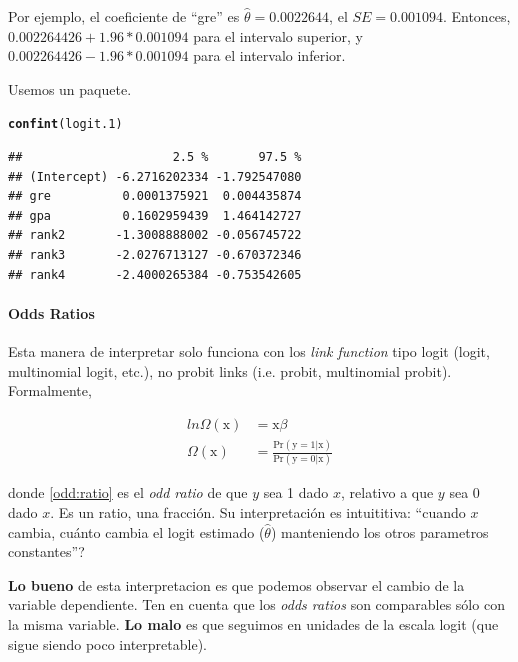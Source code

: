 \documentclass[onesided]{article}\usepackage[]{graphicx}\usepackage[]{color}
\makeatletter
\newcommand{\hlstd}[1]{\textcolor[rgb]{0.345,0.345,0.345}{#1}}%
\newcommand{\hlkwd}[1]{\textcolor[rgb]{0.737,0.353,0.396}{\textbf{#1}}}%
\newenvironment{kframe}{%
 \def\at@end@of@kframe{}%
 \ifinner\ifhmode%
  \def\at@end@of@kframe{\end{minipage}}%
  \begin{minipage}{\columnwidth}%
 \fi\fi%
 \def\FrameCommand##1{\hskip\@totalleftmargin \hskip-\fboxsep
 \colorbox{shadecolor}{##1}\hskip-\fboxsep
     \hskip-\linewidth \hskip-\@totalleftmargin \hskip\columnwidth}%
 \MakeFramed {\advance\hsize-\width
   \@totalleftmargin\z@ \linewidth\hsize
   \@setminipage}}%
 {\par\unskip\endMakeFramed%
 \at@end@of@kframe}
\newenvironment{knitrout}{}{} %
\makeatother
\begin{document}
Por ejemplo, el coeficiente de ``gre'' es $\hat\theta=0.0022644$, el $SE = 0.001094$. Entonces, $0.002264426 + 1.96*0.001094$ para el intervalo superior, y $0.002264426 - 1.96*0.001094$ para el intervalo inferior. 

Usemos un paquete.



\begin{knitrout}
\color{fgcolor}\begin{kframe}
\begin{alltt}
\hlkwd{confint}\hlstd{(logit.1)}
\end{alltt}
\begin{verbatim}
##                     2.5 %       97.5 %
## (Intercept) -6.2716202334 -1.792547080
## gre          0.0001375921  0.004435874
## gpa          0.1602959439  1.464142727
## rank2       -1.3008888002 -0.056745722
## rank3       -2.0276713127 -0.670372346
## rank4       -2.4000265384 -0.753542605
\end{verbatim}
\end{kframe}
\end{knitrout}


\paragraph{Odds Ratios}

Esta manera de interpretar solo funciona con los \emph{link function} tipo logit (logit, multinomial logit, etc.), no probit links (i.e. probit, multinomial probit). Formalmente, 

\begin{equation}\label{odd:ratio}
\begin{split}
ln \Omega(\text{x}) & = \text{x}\beta \\
\Omega(\text{x}) & = \frac{\text{Pr}(\text{y}=1 | \text{x})}{\text{Pr}(\text{y}=0 | \text{x})} 
\end{split}
\end{equation}

donde \autoref{odd:ratio} es el \emph{odd ratio} de que $y$ sea 1 dado $x$, relativo a que $y$ sea 0 dado $x$. Es un ratio, una fracci\'on. Su interpretaci\'on es intuititiva: ``cuando $x$ cambia, cu\'anto cambia el logit estimado ($\hat\theta$) manteniendo los otros parametros constantes''?

{\bf Lo bueno} de esta interpretacion es que podemos observar el cambio de la variable dependiente. Ten en cuenta que los \emph{odds ratios} son comparables s\'olo con la misma variable. {\bf Lo malo} es que seguimos en unidades de la escala logit (que sigue siendo poco interpretable).
\end{document}
